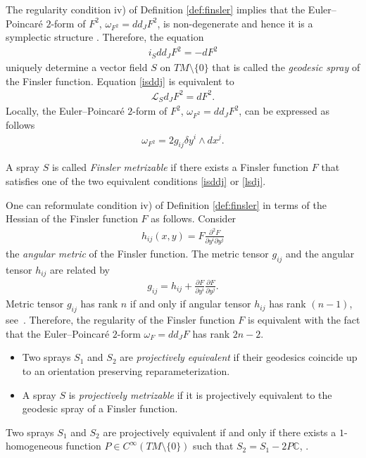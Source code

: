 \documentclass[11pt]{article}
\numberwithin{equation}{section}
\begin{document}
The regularity condition iv) of Def\/inition \ref{def:finsler} implies that the
Euler--Poincar\'e $2$-form of $F^2$, $\omega_{F^2}=dd_JF^2$, is non-degenerate
and hence it is a symplectic structure \cite{deleon89, morandi90}. Therefore, the equation
\begin{gather} i_Sdd_JF^2=-dF^2 \label{isddj}
\end{gather}
uniquely determine a vector f\/ield $S$ on $TM\setminus\{0\}$ that is called the
\emph{geodesic spray} of the Finsler function. Equation \eqref{isddj}
is equivalent to
\begin{gather} \mathcal{L}_Sd_JF^2=dF^2. \label{lsdj}
\end{gather}
Locally, the Euler--Poincar\'e $2$-form of $F^2$, $\omega_{F^2}=dd_JF^2$, can
be expressed as follows
\begin{gather*}
\omega_{F^2}=2g_{ij}\delta y^i \wedge dx^j. %
\end{gather*}
\begin{Definition} \label{defn:finsler_metr}
A spray $S$ is called \emph{Finsler metrizable} if there exists a
Finsler function $F$ that satisf\/ies one of the two equivalent
conditions \eqref{isddj} or \eqref{lsdj}.
\end{Definition}
One can reformulate condition iv) of Def\/inition \ref{def:finsler}
in terms of the Hessian of the Finsler function $F$ as follows.
Consider
\begin{gather*}
h_{ij}(x,y)=F\frac{\partial^2 F}{\partial y^i\partial y^j}
\end{gather*} the \emph{angular metric} of the Finsler function.
The metric tensor $g_{ij}$ and the angular tensor $h_{ij}$ are
related by
\begin{gather*}
g_{ij}=h_{ij} + \frac{\partial F}{\partial y^i} \frac{\partial
F}{\partial y^j}. %
\end{gather*} Metric tensor
$g_{ij}$ has rank $n$ if and only if angular tensor $h_{ij}$ has
rank $(n-1)$, see~\cite{matsumoto86}. Therefore, the regularity of
the Finsler function $F$ is equivalent with the fact that the
Euler--Poincar\'e $2$-form $\omega_{F}=dd_JF$ has rank $2n-2$.
\begin{Definition}\qquad
\begin{itemize} \itemsep=0pt \item[i)] Two sprays $S_1$ and $S_2$ are \emph{projectively equivalent}
if their geodesics coincide up to an orientation preserving
reparameterization. \item[ii)] A spray $S$ is \emph{projectively
metrizable} if it is projectively equivalent to the geodesic spray
of a Finsler function.
\end{itemize}
\end{Definition}
Two sprays $S_1$ and $S_2$ are projectively equivalent if and only
if there exists a $1$-homogeneous function $P\in
C^{\infty}(TM\setminus\{0\})$ such that $S_2=S_1-2P\mathbb{C}$,
\cite{aim93, shen01}.
\end{document}
